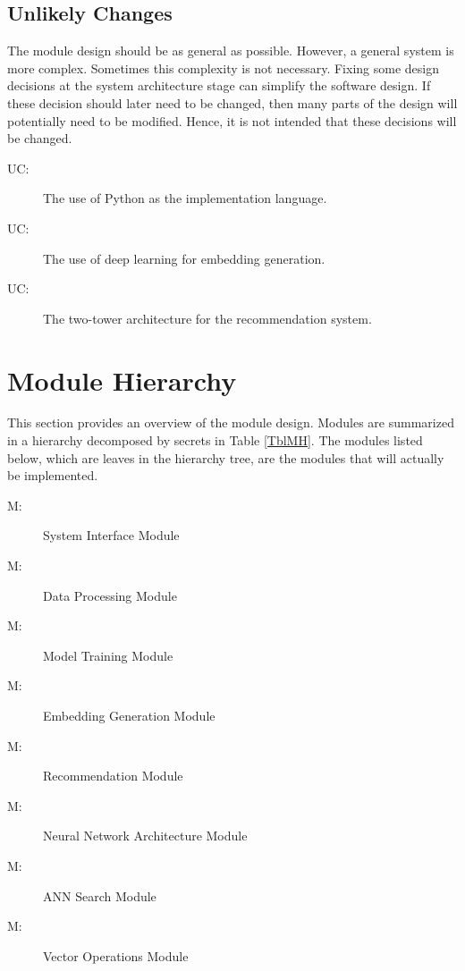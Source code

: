 \documentclass[12pt, titlepage]{article}
\newcounter{ucnum}
\newcommand{\uctheucnum}{UC\theucnum}
\newcounter{mnum}
\newcommand{\mthemnum}{M\themnum}
\begin{document}
\subsection{Unlikely Changes} \label{SecUchange}

The module design should be as general as possible. However, a general system is
more complex. Sometimes this complexity is not necessary. Fixing some design
decisions at the system architecture stage can simplify the software design. If
these decision should later need to be changed, then many parts of the design
will potentially need to be modified. Hence, it is not intended that these
decisions will be changed.

\begin{description}
\item[ \uctheucnum \label{ucImplementation}:] The use of Python as the implementation language.
\item[ \uctheucnum \label{ucDeepLearning}:] The use of deep learning for embedding generation.
\item[ \uctheucnum \label{ucTTE}:] The two-tower architecture for the recommendation system.
\end{description}

\section{Module Hierarchy} \label{SecMH}

This section provides an overview of the module design. Modules are summarized
in a hierarchy decomposed by secrets in Table \ref{TblMH}. The modules listed
below, which are leaves in the hierarchy tree, are the modules that will
actually be implemented.

\begin{description}

\item [ \mthemnum \label{mSI}:] System Interface Module
\item [ \mthemnum \label{mDP}:] Data Processing Module
\item [ \mthemnum \label{mMT}:] Model Training Module
\item [ \mthemnum \label{mEG}:] Embedding Generation Module
\item [ \mthemnum \label{mRe}:] Recommendation Module
\item [ \mthemnum \label{mNN}:] Neural Network Architecture Module
\item [ \mthemnum \label{mANN}:] ANN Search Module
\item [ \mthemnum \label{mVO}:] Vector Operations Module
\end{description}
\end{document}
